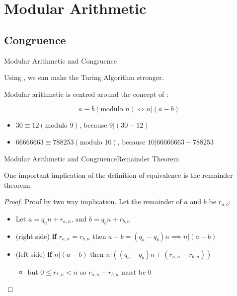 \section{Modular Arithmetic}




\subsection{Congruence}
\begin{frame}{Modular Arithmetic and Congruence}

  Using , we can make the Turing Algorithm stronger.\bigskip

  Modular arithmetic is centred around the concept of :

  \begin{equation*}
    a\equiv b (\text{modulo } n) \iff n|(a-b)
  \end{equation*}\bigskip

  \begin{itemize}
\item $30\equiv12 (\text{modulo } 9)$,\hspace{4.3cm} because $9|(30-12)$
\item $66666663 \equiv 788253 (\text{modulo } 10)$,\hspace{2cm} because $10|66666663 - 788253$
  \end{itemize}
\end{frame}

\begin{frame}{Modular Arithmetic and Congruence}{Remainder Theorem}

  One important implication of the definition of equivalence is the remainder theorem:


  \begin{proof}
    Proof by two way implication. Let the remainder of $a$ and $b$ be $r_{a,b}$:

    \begin{itemize}
    \item Let $a = q_an + r_{a,n}$, and $b = q_bn + r_{b,n}$
    \item (right side) {\bf if} $r_{a,n} = r_{b,n}$ then $a-b = (q_a-q_b)n \implies n|(a-b)$
    \item (left side) {\bf if} $n|(a-b)$ then $n|((q_a-q_b)n+(r_{a,n}-r_{b,n}))$
    \begin{itemize}
      \item but $0 \leq r_{*,n} < n$ so $r_{a,n}-r_{b,n}$ must be 0
    \end{itemize}
    \end{itemize}
  \end{proof}
\end{frame}

